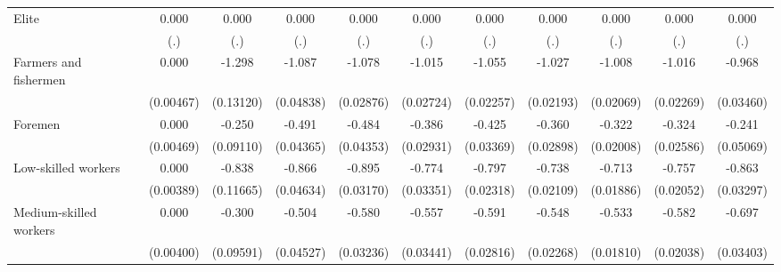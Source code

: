 {\begin{tabular}{l*{10}{c}}
Elite               &       0.000         &       0.000         &       0.000         &       0.000         &       0.000         &       0.000         &       0.000         &       0.000         &       0.000         &       0.000         \\
                    &         (.)         &         (.)         &         (.)         &         (.)         &         (.)         &         (.)         &         (.)         &         (.)         &         (.)         &         (.)         \\
Farmers and fishermen&       0.000         &      -1.298\sym{***}&      -1.087\sym{***}&      -1.078\sym{***}&      -1.015\sym{***}&      -1.055\sym{***}&      -1.027\sym{***}&      -1.008\sym{***}&      -1.016\sym{***}&      -0.968\sym{***}\\
                    &   (0.00467)         &   (0.13120)         &   (0.04838)         &   (0.02876)         &   (0.02724)         &   (0.02257)         &   (0.02193)         &   (0.02069)         &   (0.02269)         &   (0.03460)         \\
Foremen             &       0.000         &      -0.250\sym{**} &      -0.491\sym{***}&      -0.484\sym{***}&      -0.386\sym{***}&      -0.425\sym{***}&      -0.360\sym{***}&      -0.322\sym{***}&      -0.324\sym{***}&      -0.241\sym{***}\\
                    &   (0.00469)         &   (0.09110)         &   (0.04365)         &   (0.04353)         &   (0.02931)         &   (0.03369)         &   (0.02898)         &   (0.02008)         &   (0.02586)         &   (0.05069)         \\
Low-skilled workers &       0.000         &      -0.838\sym{***}&      -0.866\sym{***}&      -0.895\sym{***}&      -0.774\sym{***}&      -0.797\sym{***}&      -0.738\sym{***}&      -0.713\sym{***}&      -0.757\sym{***}&      -0.863\sym{***}\\
                    &   (0.00389)         &   (0.11665)         &   (0.04634)         &   (0.03170)         &   (0.03351)         &   (0.02318)         &   (0.02109)         &   (0.01886)         &   (0.02052)         &   (0.03297)         \\
Medium-skilled workers&       0.000         &      -0.300\sym{**} &      -0.504\sym{***}&      -0.580\sym{***}&      -0.557\sym{***}&      -0.591\sym{***}&      -0.548\sym{***}&      -0.533\sym{***}&      -0.582\sym{***}&      -0.697\sym{***}\\
                    &   (0.00400)         &   (0.09591)         &   (0.04527)         &   (0.03236)         &   (0.03441)         &   (0.02816)         &   (0.02268)         &   (0.01810)         &   (0.02038)         &   (0.03403)         \\

\end{tabular}}

